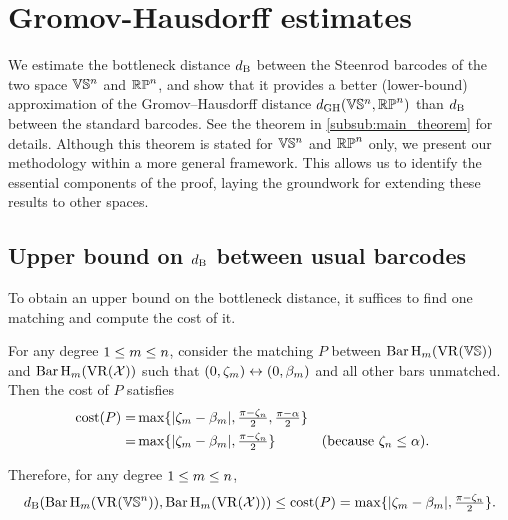 
\section{Gromov-Hausdorff estimates}\label{prop:db estimate}

We estimate the bottleneck distance $\db$ between the Steenrod barcodes of the two space $\VS^n$ and $\rp^n$, and show that it provides a better (lower-bound) approximation of the Gromov--Hausdorff distance $\dgh(\VS^n, \rp^n)$ than $\db$ between the standard barcodes.
See the theorem in \cref{subsub:main_theorem} for details.
Although this theorem is stated for $\VS^n$ and $\rp^n$ only, we present our methodology within a more general framework.
This allows us to identify the essential components of the proof, laying the groundwork for extending these results to other spaces.

\subsection{Upper bound on $\db$ between usual barcodes}
\label{subsub:db_upper_bound}

To obtain an upper bound on the bottleneck distance, it suffices to find one matching and compute the cost of it. 

For any degree $1 \leq \degp \leq n$, consider the matching $P$ between $\Hbarc[\field]{\degp}{\VS}$ and $\Hbarc[\field]{\degp}{\cX}$ such that $(0,\zeta_\degp ) \leftrightarrow (0, \beta_\degp )$ and all other bars unmatched. 
Then the cost of $P$ satisfies
\begin{align*}
    \cost(P) 
    = & \max\{|\zeta_\degp  - \beta_\degp |, \tfrac{\pi - \zeta_n}{2}, \tfrac{\pi - \alpha}{2}\} \\
    = & \max\{|\zeta_\degp  - \beta_\degp |, \tfrac{\pi - \zeta_n}{2}\} && \mbox{(because $\zeta_n \leq \alpha$)}.
\end{align*}

Therefore, for any degree $1 \leq \degp \leq n$,
\begin{equation}\label{eq:db_usual_upper_bound}
    \db(\Hbarc[\field]{\degp}{\VS^n}, \Hbarc[\field]{\degp}{\cX})
    \leq \cost(P) 
    = \max\{|\zeta_\degp  - \beta_\degp |, \tfrac{\pi - \zeta_n}{2}\}.
\end{equation}


